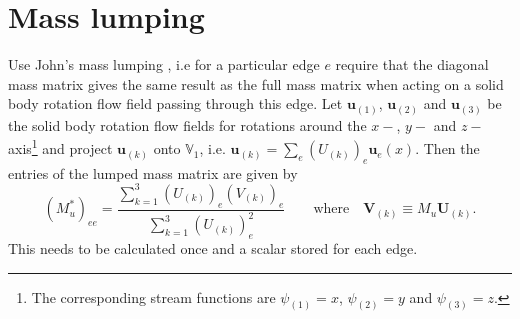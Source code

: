 \documentclass[12pt]{article}
\renewcommand{\vec}[1]{\boldsymbol{#1}}
\newcommand{\Vvelocity}{\mathbb{V}_1}
\begin{document}
\section{Mass lumping}\label{sec:MassLumping}
Use John's mass lumping \cite{Thuburn2013}, i.e for a particular edge $e$ require that the diagonal mass matrix gives the same result as the full mass matrix when acting on a solid body rotation flow field passing through this edge. Let $\vec{u}_{(1)}$, $\vec{u}_{(2)}$ and $\vec{u}_{(3)}$ be the solid body rotation flow fields for rotations around the $x-$, $y-$ and $z-$ axis\footnote{The corresponding stream functions are $\psi_{(1)} = x$, $\psi_{(2)}= y$ and $\psi_{(3)}=z$.} and project $\vec{u}_{(k)}$ onto $\Vvelocity$, i.e. $\vec{u}_{(k)} = \sum_e \left(U_{(k)}\right)_e \vec{u}_e(x)$. 
Then the entries of the lumped mass matrix are given by
\begin{equation}
  \left(M^*_{u}\right)_{ee} = \frac{\sum_{k=1}^3 \left(U_{(k)}\right)_e\left(V_{(k)}\right)_e}{\sum_{k=1}^3 \left(U_{(k)}\right)^2_e} \qquad
  \text{where}\quad \vec{V}_{(k)} \equiv M_{u} \vec{U}_{(k)}.
\end{equation}
This needs to be calculated once and a scalar stored for each edge.

\nocite{Verfurth1984}
\nocite{Ewing1990}
\nocite{Braess1997}
\nocite{Beckie1993}
\nocite{Brenner1992}
\nocite{Wagner95}



\end{document}
